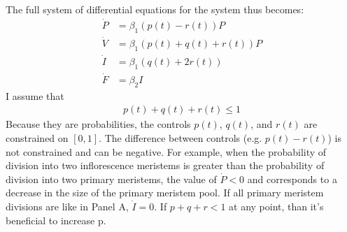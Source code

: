 \documentclass[12pt, oneside]{article}   	%
\begin{document}
The full system of differential equations for the system thus becomes:
%
\begin{align}
\dot{P} & = \beta_1 (p(t) - r(t)) P  \nonumber \\
\dot{V} & = \beta_1 (p(t) + q(t) + r(t) ) P     \nonumber \\
\dot{I} & =  \beta_1 (q(t) + 2 r(t) ) \nonumber \\
\dot{F} & = \beta_2 I
\end{align}
%
I assume that 
%
\begin{align}
p(t) + q(t) + r(t) \leq 1
\end{align}
Because they are probabilities, the controls $p(t)$, $q(t)$, and $r(t)$ are constrained on $[0,1]$. The difference between controls (e.g. $p(t) - r(t)$) is not constrained and can be negative. For example, when the probability of division into two inflorescence meristems is greater than the probability of division into two primary meristems, the value of $\dot{P}<0$ and corresponds to a decrease in the size of the primary meristem pool. If all primary meristem divisions are like in Panel A, $\dot{I} = 0$. If $p + q + r < 1$ at any point, than it's beneficial to increase p.
\end{document}
